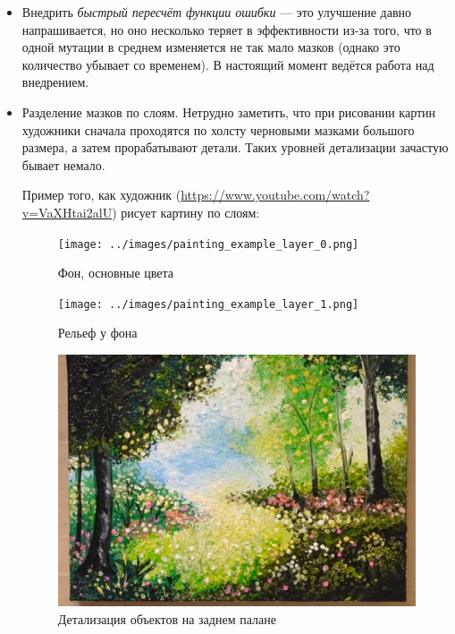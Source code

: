 \documentclass[11pt]{article}
\begin{document}
    \begin{itemize}
        \item Внедрить \textit{быстрый пересчёт функции ошибки} — это улучшение давно напрашивается,
                но оно несколько теряет в эффективности из-за того, что в одной мутации в среднем изменяется не так мало мазков (однако это количество убывает со временем).
                В настоящий момент ведётся работа над внедрением.
        \item Разделение мазков по слоям.
                Нетрудно заметить, что при рисовании картин художники сначала проходятся по холсту черновыми мазками большого размера, а затем \— прорабатывают детали.
                Таких уровней детализации зачастую бывает немало.

        Пример того, как художник (\href{https://www.youtube.com/watch?v=VaXHtai2alU}{https://www.youtube.com/watch?v=VaXHtai2alU}) рисует картину по слоям:
        \begin{figure}[!htb]
            \centering

                \texttt{[image: ../images/painting\_example\_layer\_0.png]}
                \caption{Фон, основные цвета}\label{fig:layer0}
            \endminipage\hfill

                \texttt{[image: ../images/painting\_example\_layer\_1.png]}
                \caption{Рельеф у фона}\label{fig:layer1}
            \endminipage\hfill

                \includegraphics[width=\linewidth]{../images/painting_example_layer_2.png}
                \caption{Детализация объектов на заднем палане}\label{fig:layer2}
            \endminipage\hfill


\end{figure}
\end{itemize}
\end{document}
